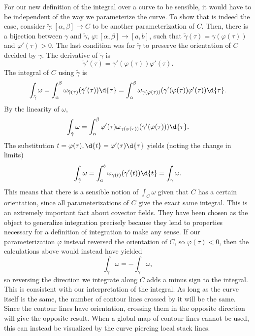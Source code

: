 \documentclass[a4paper,12pt]{article}
\begin{document}
For our new definition of the integral over a curve to be sensible, it would have to be independent of the way we parameterize the curve.
To show that is indeed the case, consider $\tilde{\gamma} \colon [\alpha, \beta] \to C$ to be another parameterization of $C$.
Then, there is a bijection between $\gamma$ and $\tilde{\gamma}$, $\varphi \colon [\alpha, \beta] \to [a, b]$, such that $\tilde{\gamma}(\tau) = \gamma(\varphi(\tau))$ and $\varphi'(\tau) > 0$.
The last condition was for $\tilde{\gamma}$ to preserve the orientation of $C$ decided by $\gamma$.
The derivative of $\tilde{\gamma}$ is
\begin{equation*}
    \tilde{\gamma}'(\tau) = \gamma'(\varphi(\tau)) \varphi'(\tau).
\end{equation*}
The integral of $C$ using $\tilde{\gamma}$ is
\begin{equation*}
    \int_{\tilde{\gamma}} \omega = \int_{\alpha}^{\beta} \omega_{\tilde{\gamma}(\tau)}(\tilde{\gamma}'(\tau)) \d{\tau} = \int_{\alpha}^{\beta} \omega_{\gamma(\varphi(\tau))}(\gamma'(\varphi(\tau)) \varphi'(\tau)) \d{\tau}.
\end{equation*}
By the linearity of $\omega$,
\begin{equation*}
    \int_{\tilde{\gamma}} \omega = \int_{\alpha}^{\beta} \varphi'(\tau) \omega_{\gamma(\varphi(\tau))}(\gamma'(\varphi(\tau))) \d{\tau}.
\end{equation*}
The substitution $t = \varphi(\tau), \d{t} = \varphi'(\tau) \d{\tau}$ yields (noting the change in limits)
\begin{equation*}
    \int_{\tilde{\gamma}} \omega = \int_{a}^{b} \omega_{\gamma(t)}(\gamma'(t)) \d{t} = \int_\gamma \omega.
\end{equation*}
This means that there is a sensible notion of $\int_C \omega$ given that $C$ has a certain orientation, since all parameterizations of $C$ give the exact same integral.
This is an extremely important fact about covector fields.
They have been chosen as the object to generalize integration precisely because they lend to properties necessary for a definition of integration to make any sense.
If our parameterization $\varphi$ instead reversed the orientation of $C$, so $\varphi(\tau) < 0$, then the calculations above would instead have yielded
\begin{equation*}
     \int_{\tilde{\gamma}} \omega = - \int_{\gamma} \omega,
\end{equation*}
so reversing the direction we integrate along $C$ adds a minus sign to the integral.
This is consistent with our interpretation of the integral.
As long as the curve itself is the same, the number of contour lines crossed by it will be the same.
Since the contour lines have orientation, crossing them in the opposite direction will give the opposite result.
When a global map of contour lines cannot be used, this can instead be visualized by the curve piercing local stack lines.
\end{document}

